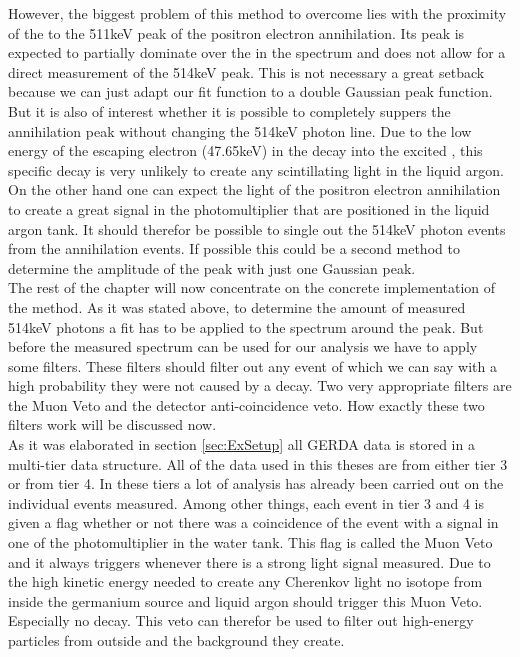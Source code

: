 \documentclass[encoding=utf8,british]{tumphthesis}
\begin{document}
However, the biggest problem of this method to overcome lies with the proximity of the \Kr to the 511keV peak of the positron electron annihilation. 
Its peak is expected to partially dominate over the \Kr in the spectrum and does not allow for a direct measurement of the 514keV peak. 
This is not necessary a great setback because we can just adapt our fit function to a double Gaussian peak function.
But it is also of interest whether it is possible to completely suppers the annihilation peak without changing the 514keV photon line.
Due to the low energy of the escaping electron (47.65keV) in the \Kr decay into the excited , this specific decay is very unlikely to create any scintillating light in the liquid argon. 
On the other hand one can expect the light of the positron electron annihilation to create a great signal in the photomultiplier that are positioned in the liquid argon tank.
It should therefor be possible to single out the 514keV photon events from the annihilation events.
If possible this could be a second method to determine the amplitude of the peak with just one Gaussian peak.
\\

The rest of the chapter will now concentrate on the concrete implementation of the method.
As it was stated above, to determine the amount of measured 514keV photons a fit has to be applied to the spectrum around the peak. 
But before the measured spectrum can be used for our analysis we have to apply some filters.
These filters should filter out any event of which we can say with a high probability they were not caused by a \Kr decay.
Two very appropriate filters are the Muon Veto and the detector anti-coincidence veto.
How exactly these two filters work will be discussed now.
\\

As it was elaborated in section \ref{sec:ExSetup} all GERDA data is stored in a multi-tier data structure. 
All of the data used in this theses are from either tier 3 or from tier 4.
In these tiers a lot of analysis has already been carried out on the individual events measured. 
Among other things, each event in tier 3 and 4 is given a flag whether or not there was a coincidence of the event with a signal in one of the photomultiplier in the water tank.
This flag is called the Muon Veto and it always triggers whenever there is a strong light signal measured.
Due to the high kinetic energy needed to create any Cherenkov light no isotope from inside the germanium source and liquid argon should trigger this Muon Veto.
Especially no \Kr decay. 
This veto can therefor be used to filter out high-energy particles from outside and the background they create.
\\
\end{document}
